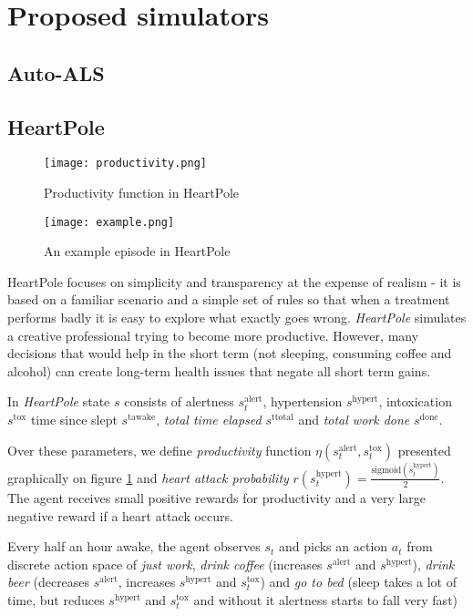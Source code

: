 \section{Proposed simulators}
\label{sec:proposed}

\subsection{Auto-ALS}
\label{sec:auto-als}


\subsection{HeartPole}

\begin{figure}
    \centering
    \texttt{[image: productivity.png]}
    \caption{Productivity function in HeartPole}
    \label{fig:productivity}
\end{figure}%

\begin{figure}
    \centering
    \texttt{[image: example.png]}
    \caption{An example episode in HeartPole}
    \label{fig:random}
\end{figure}

HeartPole focuses on simplicity and transparency at the expense of realism - it is based on a familiar scenario and a simple set of rules so that when a treatment performs badly it is easy to explore what exactly goes wrong. 
\emph{HeartPole} simulates a creative professional trying to become more productive.
However, many decisions that would help in the short term (not sleeping, consuming coffee and alcohol) can create long-term health issues that negate all short term gains.

In \emph{HeartPole} state $s$ consists of alertness $s^\text{alert}_t$, hypertension $s^\text{hypert}$, intoxication $s^\text{tox}$ time since slept $s^\text{tawake}$, \emph{total time elapsed} $s^\text{ttotal}$ and \emph{total work done} $s^\text{done}$.

Over these parameters, we define \emph{productivity} function $\eta(s^\text{alert}_t, s^\text{tox}_t)$ presented graphically on figure \ref{fig:productivity} and \emph{heart attack probability} $r(s^\text{hypert}_t)=\frac{\text{sigmoid}(s^\text{hypert}_t)}{2}$.
The agent receives small positive rewards for productivity and a very large negative reward if a heart attack occurs.

Every half an hour awake, the agent observes $s_t$ and picks an action $a_t$ from discrete action space of \emph{just work}, \emph{drink coffee} (increases $s^\text{alert}$ and $s^\text{hypert}$), \emph{drink beer} (decreases $s^\text{alert}$, increases $s^\text{hypert}$ and $s^\text{tox}_t$) and \emph{go to bed} (sleep takes a lot of time, but reduces $s^\text{hypert}$ and $s^\text{tox}_t$ and without it alertness starts to fall very fast)

